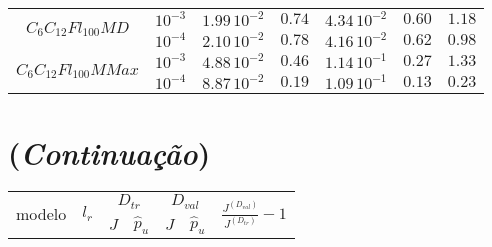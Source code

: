 \begin{tiny}
\begin{table}[H]
\begin{center}
\begin{tabular}{ |c|c|c|c|c|c|c| }
\hline\hline
\multirow{2}{*}{$C_6C_{12}Fl_{100}MD$}
& $10^{-3}$ & $1.99\,10^{-2}$ & $0.74$ & $4.34\,10^{-2}$ & $0.60$ & $1.18$ \\ \cline{2-7}
& $10^{-4}$ & $2.10\,10^{-2}$ & $0.78$ & $4.16\,10^{-2}$ & $0.62$ & $0.98$ \\ \cline{2-7}
\hline\hline
\multirow{2}{*}{$C_6C_{12}Fl_{100}MMax$}
& $10^{-3}$ & $4.88\,10^{-2}$ & $0.46$ & $1.14\,10^{-1}$ & $0.27$ & $1.33$ \\ \cline{2-7}
& $10^{-4}$ & $8.87\,10^{-2}$ & $0.19$ & $1.09\,10^{-1}$ & $0.13$ & $0.23$ \\ \cline{2-7}


\hline
		\end{tabular}\hfill%
\end{center}

\end{table}

\newpage
\section*{(\textit{Continuação})}
\begin{table}[H]
	\begin{center}
		\begin{tabular}{ |c|c|c|c|c|c|c| }
			
			\hline
			\multirow{2}{*}{modelo} & 
			\multirow{2}{*}{$l_r$} & 
			\multicolumn{2}{c|}{$D_{tr}$} &
			\multicolumn{2}{c|}{$D_{val}$} &
			\multirow{2}{*}{$\frac{J^{(D_{val})}}{J^{(D_{tr})}} - 1$}   \\ \cline{3-6}
			&  & $J$ & $\hat{p}_u$ & $J$ & $\hat{p}_u$  &  \\[2pt]
			

\end{tabular}
\end{center}
\end{table}
\end{tiny}
